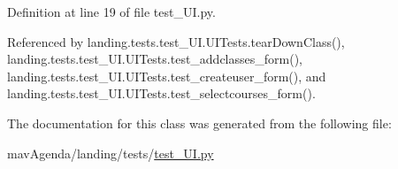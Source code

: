 Definition at line 19 of file test\+\_\+\+U\+I.\+py.



Referenced by landing.\+tests.\+test\+\_\+\+U\+I.\+U\+I\+Tests.\+tear\+Down\+Class(), landing.\+tests.\+test\+\_\+\+U\+I.\+U\+I\+Tests.\+test\+\_\+addclasses\+\_\+form(), landing.\+tests.\+test\+\_\+\+U\+I.\+U\+I\+Tests.\+test\+\_\+createuser\+\_\+form(), and landing.\+tests.\+test\+\_\+\+U\+I.\+U\+I\+Tests.\+test\+\_\+selectcourses\+\_\+form().



The documentation for this class was generated from the following file\+:\begin{DoxyCompactItemize}
\item 
mav\+Agenda/landing/tests/\mbox{\hyperlink{test__UI_8py}{test\+\_\+\+U\+I.\+py}}\end{DoxyCompactItemize}
